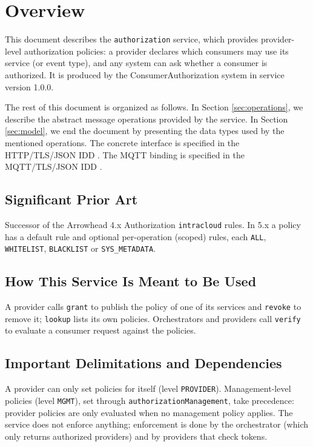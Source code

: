 \documentclass[a4paper]{arrowhead}
\begin{document}
\section{Overview}
\label{sec:overview}

This document describes the \texttt{authorization} service, which provides provider-level authorization policies: a provider declares which consumers may use its service (or event type), and any system can ask whether a consumer is authorized.
It is produced by the ConsumerAuthorization system \cite{ca-sysd} in service version 1.0.0.

The rest of this document is organized as follows.
In Section \ref{sec:operations}, we describe the abstract message operations provided by the service.
In Section \ref{sec:model}, we end the document by presenting the data types used by the mentioned operations.
The concrete interface is specified in the HTTP/TLS/JSON IDD \cite{ca-authorization-http-idd}. The MQTT binding is specified in the MQTT/TLS/JSON IDD \cite{ca-authorization-mqtt-idd}.

\subsection{Significant Prior Art}

Successor of the Arrowhead 4.x Authorization \texttt{intracloud} rules. In 5.x a policy has a default rule and optional per-operation (scoped) rules, each \texttt{ALL}, \texttt{WHITELIST}, \texttt{BLACKLIST} or \texttt{SYS\_\allowbreak{}METADATA}.

\subsection{How This Service Is Meant to Be Used}

A provider calls \texttt{grant} to publish the policy of one of its services and \texttt{revoke} to remove it; \texttt{lookup} lists its own policies. Orchestrators and providers call \texttt{verify} to evaluate a consumer request against the policies.

\subsection{Important Delimitations and Dependencies}
\label{sec:delimitations}

A provider can only set policies for itself (level \texttt{PROVIDER}). Management-level policies (level \texttt{MGMT}), set through \texttt{authorization\allowbreak{}Management}, take precedence: provider policies are only evaluated when no management policy applies. The service does not enforce anything; enforcement is done by the orchestrator (which only returns authorized providers) and by providers that check tokens.
\end{document}
